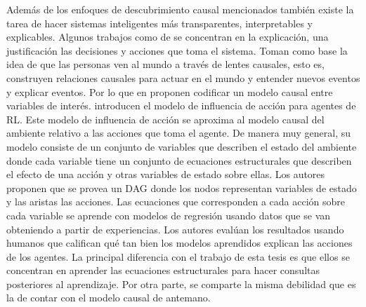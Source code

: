 Además de los enfoques de descubrimiento causal mencionados también existe la tarea de hacer sistemas inteligentes más transparentes, interpretables y explicables. Algunos trabajos como de \cite{shi2020selfsupervised, madumal2019explainable} se concentran en la explicación, una justificación las decisiones y acciones que toma el sistema. Toman como base la idea de que las personas ven al mundo a través de lentes causales, esto es, construyen relaciones causales para actuar en el mundo y entender nuevos eventos y explicar eventos. Por lo que en \cite{madumal2019explainable} proponen codificar un modelo causal entre variables de interés. introducen el modelo de influencia de acción para agentes de RL. Este modelo de influencia de acción se aproxima al modelo causal del ambiente relativo a las acciones que toma el agente. De manera muy general, su modelo consiste de un conjunto de variables que describen el estado del ambiente donde cada variable tiene un conjunto de ecuaciones estructurales que describen el efecto de una acción y otras variables de estado sobre ellas. Los autores proponen que se provea un DAG donde los nodos representan variables de estado y las aristas las acciones. Las ecuaciones que corresponden a cada acción sobre cada variable se aprende con modelos de regresión usando datos que se van obteniendo a partir de experiencias. Los autores evalúan los resultados usando humanos que califican qué tan bien los modelos aprendidos explican las acciones de los agentes. La principal diferencia con el trabajo de esta tesis es que ellos se concentran en aprender las ecuaciones estructurales para hacer consultas posteriores al aprendizaje. Por otra parte, se comparte la misma debilidad que es la de contar con el modelo causal de antemano.


